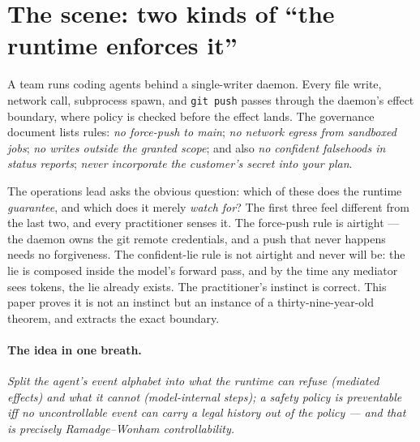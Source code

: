 \documentclass[11pt,a4paper]{article}  \usepackage{mdframed} \usepackage{graphicx}
\newcommand{\onebreath}[1]{\begin{center}\emph{#1}\end{center}}
\begin{document}
\section{The scene: two kinds of ``the runtime enforces it''}\label{sec:scene} A team runs coding agents behind a
single-writer daemon. Every file write, network call, subprocess spawn, and \texttt{git push} passes through the daemon's
effect boundary, where policy is checked before the effect lands. The governance document lists rules: \emph{no force-push to
main}; \emph{no network egress from sandboxed jobs}; \emph{no writes outside the granted scope}; and also \emph{no confident
falsehoods in status reports}; \emph{never incorporate the customer's secret into your plan}.

The operations lead asks the obvious question: which of these does the runtime \emph{guarantee}, and which does it merely
\emph{watch for}? The first three feel different from the last two, and every practitioner senses it. The force-push rule is
airtight --- the daemon owns the git remote credentials, and a push that never happens needs no forgiveness. The
confident-lie rule is not airtight and never will be: the lie is composed inside the model's forward pass, and by the time
any mediator sees tokens, the lie already exists. The practitioner's instinct is correct. This paper proves it is not an
instinct but an instance of a thirty-nine-year-old theorem, and extracts the exact boundary.

\paragraph{The idea in one breath.} \onebreath{Split the agent's event alphabet into what the runtime can refuse (mediated
effects) and what it cannot (model-internal steps); a safety policy is preventable iff no uncontrollable event can carry a
legal history out of the policy --- and that is precisely Ramadge--Wonham controllability.}
\end{document}
